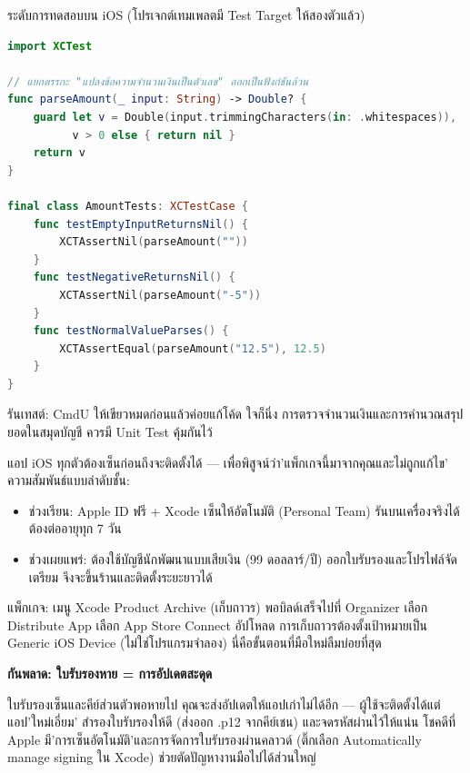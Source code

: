 \begin{center}\small\color{gray}ระดับการทดสอบบน iOS (โปรเจกต์เทมเพลตมี Test Target ให้สองตัวแล้ว)\end{center}

\begin{lstlisting}[language=Swift]
import XCTest

// แยกตรรกะ "แปลงข้อความจำนวนเงินเป็นตัวเลข" ออกเป็นฟังก์ชันล้วน
func parseAmount(_ input: String) -> Double? {
    guard let v = Double(input.trimmingCharacters(in: .whitespaces)),
          v > 0 else { return nil }
    return v
}

final class AmountTests: XCTestCase {
    func testEmptyInputReturnsNil() {
        XCTAssertNil(parseAmount(""))
    }
    func testNegativeReturnsNil() {
        XCTAssertNil(parseAmount("-5"))
    }
    func testNormalValueParses() {
        XCTAssertEqual(parseAmount("12.5"), 12.5)
    }
}
\end{lstlisting}

รันเทสต์: CmdU ให้เขียวหมดก่อนแล้วค่อยแก้โค้ด ใจก็นิ่ง การตรวจจำนวนเงินและการคำนวณสรุปยอดในสมุดบัญชี ควรมี Unit Test คุ้มกันไว้


แอป iOS ทุกตัวต้องเซ็นก่อนถึงจะติดตั้งได้ — เพื่อพิสูจน์ว่า'แพ็กเกจนี้มาจากคุณและไม่ถูกแก้ไข' ความสัมพันธ์แบบลำดับชั้น:

\begin{itemize}
  \item ช่วงเรียน: Apple ID ฟรี + Xcode เซ็นให้อัตโนมัติ (Personal Team) รันบนเครื่องจริงได้ ต้องต่ออายุทุก 7 วัน
  \item ช่วงเผยแพร่: ต้องใช้บัญชีนักพัฒนาแบบเสียเงิน (99 ดอลลาร์/ปี) ออกใบรับรองและโปรไฟล์จัดเตรียม จึงจะขึ้นร้านและติดตั้งระยะยาวได้
\end{itemize}

แพ็กเกจ: เมนู Xcode Product Archive (เก็บถาวร) พอบิลด์เสร็จไปที่ Organizer เลือก Distribute App เลือก App Store Connect อัปโหลด การเก็บถาวรต้องตั้งเป้าหมายเป็น Generic iOS Device (ไม่ใช่โปรแกรมจำลอง) นี่คือขั้นตอนที่มือใหม่ลืมบ่อยที่สุด

\textbf{กันพลาด: ใบรับรองหาย = การอัปเดตสะดุด}\par

ใบรับรองเซ็นและคีย์ส่วนตัวพอหายไป คุณจะส่งอัปเดตให้แอปเก่าไม่ได้อีก — ผู้ใช้จะติดตั้งได้แต่แอป'ใหม่เอี่ยม' สำรองใบรับรองให้ดี (ส่งออก .p12 จากคีย์เชน) และจดรหัสผ่านไว้ให้แน่น โชคดีที่ Apple มี'การเซ็นอัตโนมัติ'และการจัดการใบรับรองผ่านคลาวด์ (ติ๊กเลือก Automatically manage signing ใน Xcode) ช่วยตัดปัญหางานมือไปได้ส่วนใหญ่

